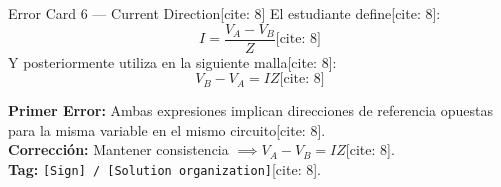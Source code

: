 \documentclass[aspectratio=169]{beamer}
\begin{document}
\begin{frame}{Error Card 6 — Current Direction[cite: 8]}
    El estudiante define[cite: 8]:
    \begin{equation*}
        I = \frac{V_A - V_B}{Z} \text{[cite: 8]}
    \end{equation*}
    Y posteriormente utiliza en la siguiente malla[cite: 8]:
    \begin{equation*}
        V_B - V_A = IZ \text{[cite: 8]}
    \end{equation*}

    \vspace{0.3cm}
    \pause
    \begin{tcolorbox}[colback=red!5, colframe=red!70!black, title=\textbf{Diagnóstico}, width=\linewidth]
        \textbf{Primer Error:} Ambas expresiones implican direcciones de referencia opuestas para la misma variable en el mismo circuito[cite: 8]. \\
        \textbf{Corrección:} Mantener consistencia $\implies V_A - V_B = IZ$[cite: 8]. \\
        \textbf{Tag:} \texttt{[Sign] / [Solution organization]}[cite: 8].
    \end{tcolorbox}
\end{frame}
\end{document}
